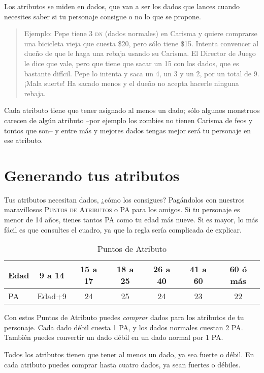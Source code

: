 Los atributos se miden en dados, que van a ser los dados que lances cuando necesites saber si tu personaje consigue o no lo que se propone. 

\begin{quotation}
Ejemplo: Pepe tiene 3 \textsc{dn} (dados normales) en Carisma y quiere comprarse una bicicleta vieja que cuesta \$20, pero sólo tiene \$15. Intenta convencer al dueño de que le haga una rebaja usando su Carisma. El Director de Juego le dice que vale, pero que tiene que sacar un 15 con los dados, que es bastante difícil. Pepe lo intenta y saca un 4, un 3 y un 2, por un total de 9. ¡Mala suerte! Ha sacado menos y el dueño no acepta hacerle ninguna rebaja.
\end{quotation}

Cada atributo tiene que tener asignado al menos un dado; sólo algunos monstruos carecen de algún atributo --por ejemplo los zombies no tienen Carisma de feos y tontos que son-- y entre más y mejores dados tengas mejor será tu personaje en ese atributo.

\section{Generando tus atributos}

Tus atributos necesitan dados, ¿cómo los consigues? Pagándolos con nuestros maravillosos \textsc{Puntos de Atributos} o \textsc{PA} para los amigos. Si tu personaje es menor de 14 años, tienes tantos \textsc{PA} como tu edad más nueve. Si es mayor, lo más fácil es que consultes el cuadro, ya que la regla sería complicada de explicar. 

\begin{table}[h]
\centering
\begin{tabular}{l c c c c c c}
\toprule
Edad&9 a 14&15 a 17&18 a 25&26 a 40&41 a 60&60 ó más\\\midrule
\textsc{PA}&Edad+9&24&25&24&23&22\\\midrule
\bottomrule
\end{tabular}
\caption{Puntos de Atributo}
\end{table}

Con estos Puntos de Atributo puedes \emph{comprar} dados para los atributos de tu personaje. Cada dado débil cuesta 1 \textsc{PA}, y los dados normales cuestan 2 \textsc{PA}. También puedes convertir un dado débil en un dado normal por 1 \textsc{PA}.

Todos los atributos tienen que tener al menos un dado, ya sea fuerte o débil. En cada atributo puedes comprar hasta cuatro dados, ya sean fuertes o débiles.

